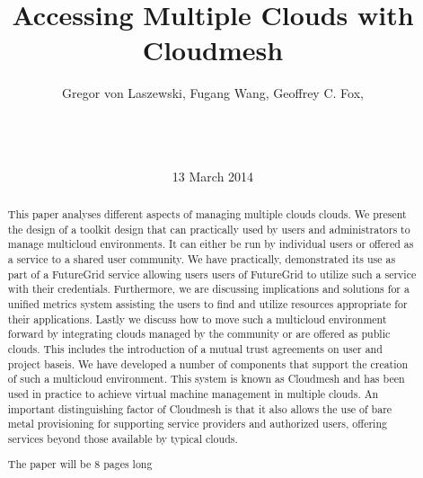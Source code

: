 \documentclass{tex/sig-alternate-2013}
\newcommand{\TITLE}{Accessing Multiple  Clouds with Cloudmesh}
\begin{document}
 

 
\title{\TITLE} 
 
\author{ 
\alignauthor 
Gregor von Laszewski, 
Fugang Wang, 
Geoffrey C. Fox, \\
       \\
       \\
       \\ 
} 
\date{13 March 2014} 
 
\toappear{} 
\maketitle 
\begin{abstract} 

  This paper analyses different aspects of managing multiple clouds
  clouds. We present the design of a toolkit design that can
  practically used by users and administrators to manage multicloud
  environments.  It can either be run by individual users or offered
  as a service to a shared user community. We have practically,
  demonstrated its use as part of a FutureGrid service allowing users
  users of FutureGrid to utilize such a service with their
  credentials. Furthermore, we are discussing implications and
  solutions for a unified metrics system assisting the users to find
  and utilize resources appropriate for their applications. Lastly we
  discuss how to move such a multicloud environment forward by
  integrating clouds managed by the community or are offered as public
  clouds. This includes the introduction of a mutual trust agreements
  on user and project baseis. We have developed a number of components
  that support the creation of such a multicloud environment. This
  system is known as Cloudmesh and has been used in practice to
  achieve virtual machine management in multiple clouds. An important
  distinguishing factor of Cloudmesh is that it also allows the use of
  bare metal provisioning for supporting service providers and
  authorized users, offering services beyond those available by
  typical clouds.

  The paper will be 8 pages long 
 
\end{abstract} 
 
\end{document}
